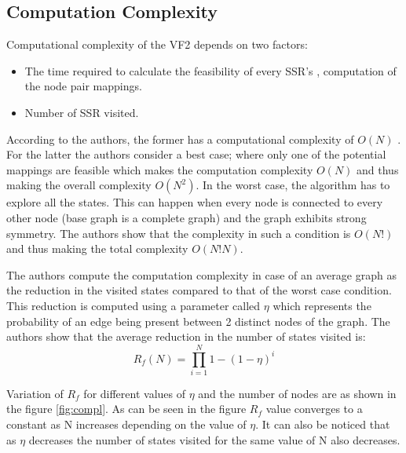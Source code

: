 \subsection{Computation Complexity}
Computational complexity of the VF2 depends on two factors: 
\begin{itemize}
\item The time required to calculate the feasibility of every SSR's , computation of the node pair mappings.
\item Number of SSR visited.
\end{itemize}

According to the authors, the former has a computational complexity of $O(N)$ . For the latter the authors consider a best case; where only one of the potential mappings are feasible which makes the computation complexity $O(N)$ and thus making the overall complexity $O(N^2)$. In the worst case, the algorithm has to explore all the states. This can happen when every node is connected to every other node (base graph is a complete graph) and the graph exhibits strong symmetry. The authors show that the complexity in such a condition is $O(N!)$ and thus making the total complexity $O(N!N)$.

The authors compute the computation complexity in case of an average graph as the reduction in the visited states compared to that of the worst case condition. This reduction is computed using a parameter called $\eta$ which represents the probability of an edge being present between 2 distinct nodes of the graph. The authors show that the average reduction in the number of states visited is:
\begin{equation*}
R_{f}(N) = \prod_{i=1}^{N} 1-(1-\eta)^{i}
\end{equation*}

 
 Variation of $R_f$ for different values of $\eta$ and the number of nodes are as shown in the figure \ref{fig:compl}. As can be seen in the figure $R_f$ value converges to a constant as N increases depending on the value of $\eta$. It can also be noticed that as $\eta$ decreases the number of states visited for the same value of N also decreases.
 
